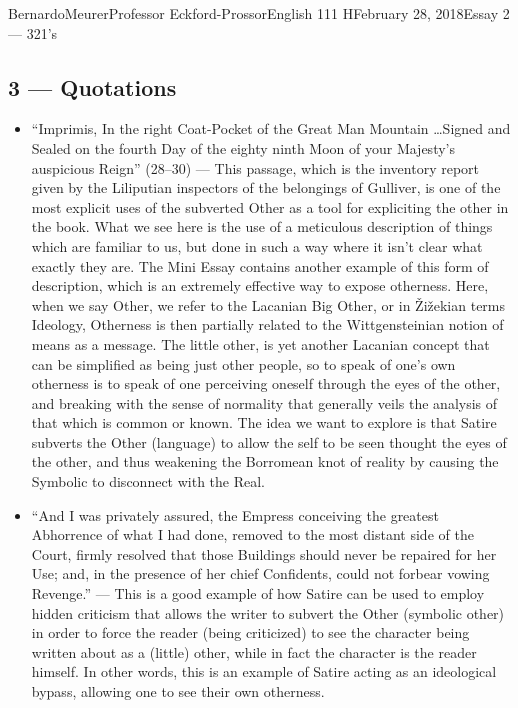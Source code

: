 \documentclass[12pt,letterpaper]{article}
\begin{document}
\begin{mla}{Bernardo}{Meurer}{Professor Eckford-Prossor}{English 111 H}{February 28, 2018}{Essay 2 --- 321's}
    \subsection*{3 --- Quotations}
    \begin{itemize}
        \item ``Imprimis, In the right Coat-Pocket of the  Great Man Mountain \ldots Signed and Sealed on the fourth Day of the eighty ninth Moon of your Majesty's auspicious Reign'' (28--30)
              \newline
              --- This passage, which is the inventory report given by the Liliputian inspectors of the belongings of Gulliver, is one of the most explicit uses of the subverted Other as a tool for expliciting the other in the book. What we see here is the use of a meticulous description of things which are familiar to us, but done in such a way where it isn't clear what exactly they are. The Mini Essay contains another example of this form of description, which is an extremely effective way to expose otherness. Here, when we say Other, we refer to the Lacanian Big Other, or in Žižekian terms Ideology, Otherness is then partially related to the Wittgensteinian notion of means as a message. The little other, is yet another Lacanian concept that can be simplified as being just other people, so to speak of one's own otherness is to speak of one perceiving oneself through the eyes of the other, and breaking with the sense of normality that generally veils the analysis of that which is common or known. The idea we want to explore is that Satire subverts the Other (language) to allow the self to be seen thought the eyes of the other, and thus weakening the Borromean knot of reality by causing the Symbolic to disconnect with the Real.

        \item ``And I was privately assured, the Empress conceiving the greatest Abhorrence of what I had done, removed to the most distant side of the Court, firmly resolved that those Buildings should never be repaired for her Use; and, in the presence of her chief Confidents, could not forbear vowing Revenge.''
              \newline
              --- This is a good example of how Satire can be used to employ hidden criticism that allows the writer to subvert the Other (symbolic other) in order to force the reader (being criticized) to see the character being written about as a (little) other, while in fact the character is the reader himself. In other words, this is an example of Satire acting as an ideological bypass, allowing one to see their own otherness.


\end{itemize}
\end{mla}
\end{document}

